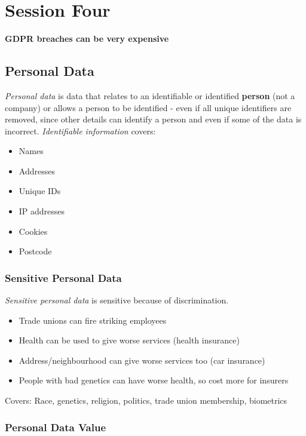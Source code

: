 \section{Session Four}\label{sec:fpse_session_four}

\textbf{GDPR breaches can be very expensive}

\subsection{Personal Data}\label{sub:personal_data}

\emph{Personal data} is data that relates to an identifiable or identified \textbf{person} (not a company) or allows a person to be identified - even if all unique identifiers are removed, since other details can identify a person and even if some of the data is incorrect.
\emph{Identifiable information} covers:

\begin{itemize}
    \item Names
    \item Addresses
    \item Unique IDs
    \item IP addresses
    \item Cookies
    \item Postcode
\end{itemize}

\subsubsection{Sensitive Personal Data}\label{ssub:sensitive_personal_data}

\emph{Sensitive personal data} is sensitive because of discrimination.

\begin{itemize}
    \item Trade unions can fire striking employees
    \item Health can be used to give worse services (health insurance)
    \item Address/neighbourhood can give worse services too (car insurance)
    \item People with bad genetics can have worse health, so cost more for insurers
\end{itemize}

\noindent
Covers: Race, genetics, religion, politics, trade union membership, biometrics

\subsubsection{Personal Data Value}\label{ssub:personal_data_value}

